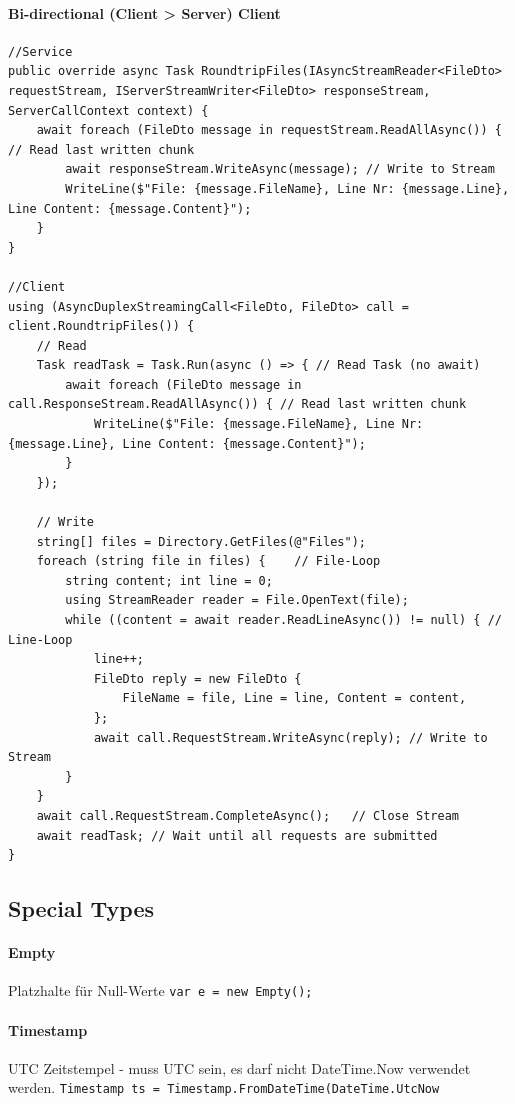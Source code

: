 \documentclass[
a4paper,
oneside,
10pt,
fleqn,
headsepline,
toc=listofnumbered, 
bibliography=totocnumbered]{scrartcl}
\begin{document}
\paragraph{Bi-directional (Client > Server) Client}
\begin{lstlisting}
//Service
public override async Task RoundtripFiles(IAsyncStreamReader<FileDto> requestStream, IServerStreamWriter<FileDto> responseStream, ServerCallContext context) {
    await foreach (FileDto message in requestStream.ReadAllAsync()) { // Read last written chunk
        await responseStream.WriteAsync(message); // Write to Stream
        WriteLine($"File: {message.FileName}, Line Nr: {message.Line}, Line Content: {message.Content}");
    }
}

//Client
using (AsyncDuplexStreamingCall<FileDto, FileDto> call = client.RoundtripFiles()) {
    // Read
    Task readTask = Task.Run(async () => { // Read Task (no await)
        await foreach (FileDto message in call.ResponseStream.ReadAllAsync()) { // Read last written chunk
            WriteLine($"File: {message.FileName}, Line Nr: {message.Line}, Line Content: {message.Content}");
        }
    });
    
    // Write
    string[] files = Directory.GetFiles(@"Files");
    foreach (string file in files) {    // File-Loop
        string content; int line = 0;
        using StreamReader reader = File.OpenText(file);
        while ((content = await reader.ReadLineAsync()) != null) { // Line-Loop
            line++;
            FileDto reply = new FileDto {
                FileName = file, Line = line, Content = content,
            };
            await call.RequestStream.WriteAsync(reply); // Write to Stream
        }
    }
    await call.RequestStream.CompleteAsync();   // Close Stream
    await readTask; // Wait until all requests are submitted
}
\end{lstlisting}

\subsection{Special Types}
\paragraph{Empty} Platzhalte für Null-Werte \lstinline{var e = new Empty();}
\paragraph{Timestamp} UTC Zeitstempel - muss UTC sein, es darf nicht DateTime.Now verwendet werden. \lstinline{Timestamp ts = Timestamp.FromDateTime(DateTime.UtcNow}
\end{document}
